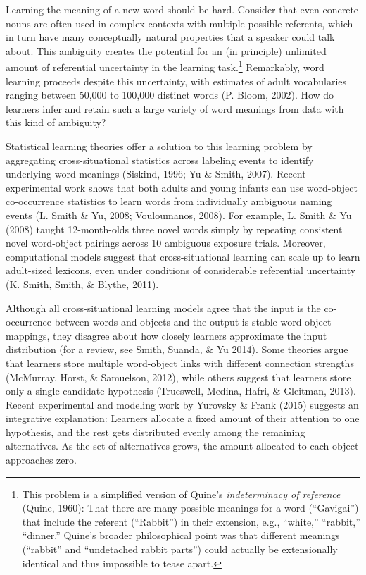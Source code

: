 \documentclass[authoryear, review]{elsarticle}
\begin{document}
Learning the meaning of a new word should be hard. Consider that even
concrete nouns are often used in complex contexts with multiple possible
referents, which in turn have many conceptually natural properties that
a speaker could talk about. This ambiguity creates the potential for an
(in principle) unlimited amount of referential uncertainty in the
learning task.\footnote{This problem is a simplified version of Quine's
  \textit{indeterminacy of reference} (Quine, 1960): That there are many
  possible meanings for a word (``Gavigai'') that include the referent
  (``Rabbit'') in their extension, e.g., ``white,'' ``rabbit,''
  ``dinner.'' Quine's broader philosophical point was that different
  meanings (``rabbit'' and ``undetached rabbit parts'') could actually
  be extensionally identical and thus impossible to tease apart.}
Remarkably, word learning proceeds despite this uncertainty, with
estimates of adult vocabularies ranging between 50,000 to 100,000
distinct words (P. Bloom, 2002). How do learners infer and retain such a
large variety of word meanings from data with this kind of ambiguity?

Statistical learning theories offer a solution to this learning problem
by aggregating cross-situational statistics across labeling events to
identify underlying word meanings (Siskind, 1996; Yu \& Smith, 2007).
Recent experimental work shows that both adults and young infants can
use word-object co-occurrence statistics to learn words from
individually ambiguous naming events (L. Smith \& Yu, 2008; Vouloumanos,
2008). For example, L. Smith \& Yu (2008) taught 12-month-olds three
novel words simply by repeating consistent novel word-object pairings
across 10 ambiguous exposure trials. Moreover, computational models
suggest that cross-situational learning can scale up to learn
adult-sized lexicons, even under conditions of considerable referential
uncertainty (K. Smith, Smith, \& Blythe, 2011).

Although all cross-situational learning models agree that the input is
the co-occurrence between words and objects and the output is stable
word-object mappings, they disagree about how closely learners
approximate the input distribution (for a review, see Smith, Suanda, \&
Yu 2014). Some theories argue that learners store multiple word-object
links with different connection strengths (McMurray, Horst, \&
Samuelson, 2012), while others suggest that learners store only a single
candidate hypothesis (Trueswell, Medina, Hafri, \& Gleitman, 2013).
Recent experimental and modeling work by Yurovsky \& Frank (2015)
suggests an integrative explanation: Learners allocate a fixed amount of
their attention to one hypothesis, and the rest gets distributed evenly
among the remaining alternatives. As the set of alternatives grows, the
amount allocated to each object approaches zero.
\end{document}
